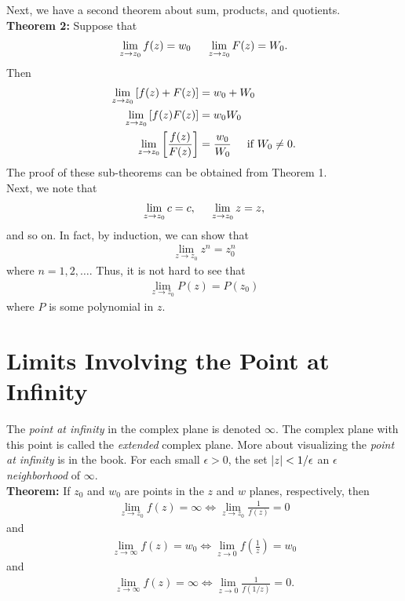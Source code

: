 \documentclass{book}
\theoremstyle{definition}
\newcommand{\f}[2]{\frac{#1}{#2}}
\newcommand{\lp}{\left(}
\newcommand{\rp}{\right)}
\newcommand{\lb}{\left[}
\newcommand{\rb}{\right]}
\begin{document}
Next, we have a second theorem about sum, products, and quotients.\\

\noindent \textbf{Theorem 2:} Suppose that 
\begin{align}
\lim_{z \to z_0} f(z) = w_0 \hspace{0.5cm} \lim_{z \to z_0} F(z) = W_0.
\end{align}
Then 
\begin{align}
\lim_{z\to z_0} \lb  f(z) + F(z) \rb &= w_0 + W_0\\
\lim_{z \to z_0} \lb f(z)F(z) \rb &= w_0 W_0\\
\lim_{z \to z_0} \lb \f{f(z)}{F(z)} \rb &= \f{w_0}{W_0} \hspace{0.5cm} \text{if }W_0 \neq 0 .
\end{align}
The proof of these sub-theorems can be obtained from Theorem 1. \\

Next, we note that
\begin{align}
\lim_{z\to z_0} c = c, \hspace{0.5cm} \lim_{z \to z_0} z = z,
\end{align}
and so on. In fact, by induction, we can show that
\begin{align}
\lim_{z\to z_0} z^n = z_0^n
\end{align}
where $n=1,2,\dots$. Thus, it is not hard to see that
\begin{align}
\lim_{z\to z_0}P(z) = P(z_0)
\end{align}
where $P$ is some polynomial in $z$.


\section{Limits Involving the Point at Infinity}



The \textit{point at infinity} in the complex plane is denoted $\infty$. The complex plane with this point is called the \textit{extended} complex plane. More about visualizing the \textit{point at infinity} is in the book. For each small $\epsilon > 0$, the set $\abs{z} < 1/\epsilon$ an $\epsilon$ \textit{neighborhood} of $\infty$.\\

\noindent \textbf{Theorem:} If $z_0$ and $w_0$ are points in the $z$ and $w$ planes, respectively, then 
\begin{align}
\lim_{z\to z_0} f(z) = \infty \iff \lim_{z\to z_0} \f{1}{f(z)} = 0
\end{align} 
and
\begin{align}
\lim_{z\to \infty} f(z) = w_0 \iff \lim_{z\to 0} f\lp \f{1}{z} \rp = w_0
\end{align}
and
\begin{align}
\lim_{z\to \infty} f(z) = \infty \iff \lim_{z\to 0}\f{1}{f(1/z)} = 0.
\end{align}
\end{document}
